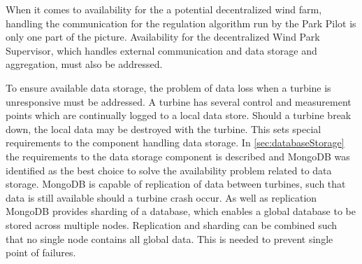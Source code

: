 %
%


When it comes to availability for the a potential decentralized wind farm, handling the communication for the regulation algorithm run by the Park Pilot is only one part of the picture. Availability for the decentralized Wind Park Supervisor, which handles external communication and data storage and aggregation, must also be addressed. 

To ensure available data storage, the problem of data loss when a turbine is unresponsive must be addressed. A turbine has several control and measurement points which are continually logged to a local data store. Should a turbine break down, the local data may be destroyed with the turbine. This sets special requirements to the component handling data storage. In \cref{sec:databaseStorage} the requirements to the data storage component is described and MongoDB was identified as the best choice to solve the availability problem related to data storage. MongoDB is capable of replication of data between turbines, such that data is still available should a turbine crash occur. As well as replication MongoDB provides sharding of a database, which enables a global database to be stored across multiple nodes. Replication and sharding can be combined such that no single node contains all global data. This is needed to prevent single point of failures. 


